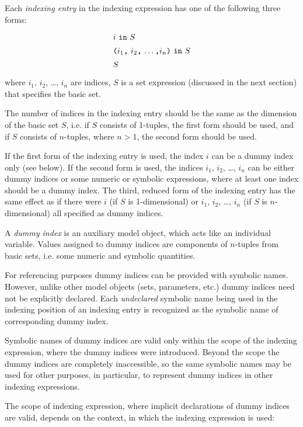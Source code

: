 \documentclass[11pt]{report}
\begin{document}
Each {\it indexing entry} in the indexing expression has one of the
following three forms:
$$
{\def\arraystretch{1.4}
\begin{array}{l}
\mbox{$i$ {\tt in} $S$}\\
\mbox{{\tt(}$i_1${\tt,} $i_2${\tt,} \dots{\tt,}$i_n${\tt)} {\tt in}
$S$}\\
\mbox{$S$}\\
\end{array}
}
$$
where $i_1$, $i_2$, \dots, $i_n$ are indices, $S$ is a set expression
(discussed in the next section) that specifies the basic set.

\newpage

The number of indices in the indexing entry should be the same as the
dimension of the basic set $S$, i.e. if $S$ consists of 1-tuples, the
first form should be used, and if $S$ consists of $n$-tuples, where
$n>1$, the second form should be used.

If the first form of the indexing entry is used, the index $i$ can be
a dummy index only (see below). If the second form is used, the indices
$i_1$, $i_2$, \dots, $i_n$ can be either dummy indices or some numeric
or symbolic expressions, where at least one index should be a dummy
index. The third, reduced form of the indexing entry has the same
effect as if there were $i$ (if $S$ is 1-dimensional) or
$i_1$, $i_2$, \dots, $i_n$ (if $S$ is $n$-dimensional) all specified as
dummy indices.

A {\it dummy index} is an auxiliary model object, which acts like an
individual variable. Values assigned to dummy indices are components of
$n$-tuples from basic sets, i.e. some numeric and symbolic quantities.

For referencing purposes dummy indices can be provided with symbolic
names. However, unlike other model objects (sets, parameters, etc.)
dummy indices need not be explicitly declared. Each {\it undeclared}
symbolic name being used in the indexing position of an indexing entry
is recognized as the symbolic name of corresponding dummy index.

Symbolic names of dummy indices are valid only within the scope of the
indexing expression, where the dummy indices were introduced. Beyond
the scope the dummy indices are completely inaccessible, so the same
symbolic names may be used for other purposes, in particular, to
represent dummy indices in other indexing expressions.

The scope of indexing expression, where implicit declarations of dummy
indices are valid, depends on the context, in which the indexing
expression is used:
\end{document}
